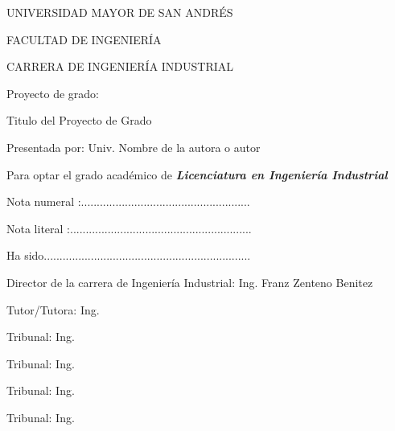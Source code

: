 \begin{center}
	{\large UNIVERSIDAD MAYOR DE SAN ANDRÉS}

	{\large FACULTAD DE INGENIERÍA}

	{\large CARRERA DE INGENIERÍA INDUSTRIAL}
\end{center}
Proyecto de grado:
\begin{center}
	\vspace{1cm}
	{\Large Titulo del Proyecto de Grado}
	\vspace{1cm}
\end{center}
Presentada por: Univ. Nombre de la autora o autor

Para optar el grado académico de \textbf{\textit{Licenciatura en Ingeniería Industrial}}

Nota numeral :......................................................

Nota literal :..........................................................

Ha sido..................................................................


Director de la carrera de Ingeniería Industrial: Ing. Franz Zenteno Benitez

\vspace{0.5cm} 
Tutor/Tutora: Ing.

\vspace{0.5cm} 
Tribunal: Ing.

\vspace{0.5cm} 
Tribunal: Ing. 

\vspace{0.5cm} 
Tribunal: Ing. 

\vspace{0.5cm} 
Tribunal: Ing.